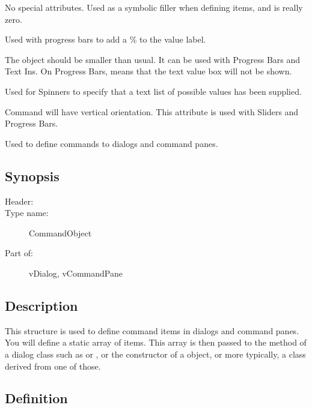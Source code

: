  No special attributes. Used as a symbolic
filler when defining items, and is really zero.

 Used with progress bars to add a \% to the
value label.

 The object should be smaller than usual. It can
be used with Progress Bars and Text Ins. On Progress Bars,
 means that the text value box will not be shown.

 Used for Spinners to specify that a text list
of possible values has been supplied.

 Command will have vertical orientation.
This attribute is used with Sliders and Progress Bars.


Used to define commands to dialogs and command panes.

\subsection* {Synopsis}

\begin{description}
	\item [Header:] 
	\item [Type name:] CommandObject
	\item [Part of:] vDialog, vCommandPane
\end{description}

\subsection* {Description}

This structure is used to define command items in dialogs and
command panes. You will define a static array of 
items. This array is then passed to the 
method of a dialog class such as  or ,
or the constructor of a  object, or more
typically, a class derived from one of those.

\subsection* {Definition}

